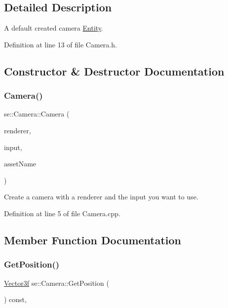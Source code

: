 \subsection{Detailed Description}
A default created camera \mbox{\hyperlink{classse_1_1_entity}{Entity}}. 

Definition at line 13 of file Camera.\+h.



\subsection{Constructor \& Destructor Documentation}
\mbox{\label{classse_1_1_camera_a45cc397abfbd7287d96dbbb70330f2e5}} 
\subsubsection{\texorpdfstring{Camera()}{Camera()}}
{\footnotesize\ttfamily se\+::\+Camera\+::\+Camera (\begin{DoxyParamCaption}\item[{\mbox{\hyperlink{classse_1_1_abstract_renderer}{Abstract\+Renderer}} $\ast$}]{renderer,  }\item[{\mbox{\hyperlink{classse_1_1_abstract_input}{Abstract\+Input}} $\ast$}]{input,  }\item[{const std\+::string \&}]{asset\+Name }\end{DoxyParamCaption})}

Create a camera with a renderer and the input you want to use. 

Definition at line 5 of file Camera.\+cpp.



\subsection{Member Function Documentation}
\mbox{\label{classse_1_1_camera_af3d7f8a74dc26a3840331ab40b6ac893}} 
\subsubsection{\texorpdfstring{Get\+Position()}{GetPosition()}}
{\footnotesize\ttfamily \mbox{\hyperlink{namespacese_a12e07512d95e2fdebdaf74a5ea2cf5f6}{Vector3f}} se\+::\+Camera\+::\+Get\+Position (\begin{DoxyParamCaption}{ }\end{DoxyParamCaption}) const\hspace{0.3cm}{\ttfamily [override]}, {\ttfamily [virtual]}}


